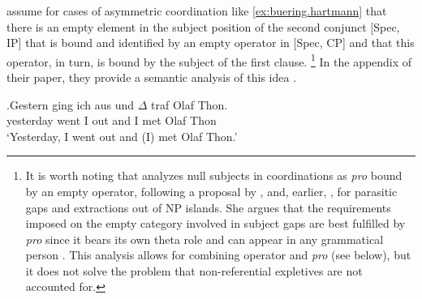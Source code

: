 \subsubsection{\citet[176--177]{buering.hartmann1998} }
\citet[176--177]{buering.hartmann1998} assume for cases of asymmetric coordination like \ref{ex:buering.hartmann} that there is an empty element in the subject position of the second conjunct [Spec, IP] that is bound and identified by an empty operator in [Spec, CP] and that this operator, in turn, is bound by the subject of the first clause.%
\footnote{It is worth noting that \citet[12]{hartmann1994} analyzes null subjects  in coordinations as \textit{pro}  bound by an empty operator, following a proposal by \citet{cinque1990}, and, earlier, \citet{chomsky1986}, for parasitic gaps and extractions out of NP islands.
She argues that the requirements imposed on the empty category involved in subject gaps are best fulfilled by \textit{pro} since it bears its own theta role and can appear in any grammatical person \citep[12--13]{hartmann1994}.
This analysis allows for combining operator and \textit{pro} (see below), but it does not solve the problem that non-referential expletives  are not accounted for.}
%
In the appendix of their paper, they provide a semantic analysis of this idea \citep[191--198]{buering.hartmann1998}.

\exg.\label{ex:buering.hartmann}Gestern ging ich aus und $\Delta$ traf Olaf Thon.\\
yesterday went I out and I met Olaf Thon\\ 
`Yesterday, I went out and (I) met Olaf Thon.' \citep[176]{buering.hartmann1998}


